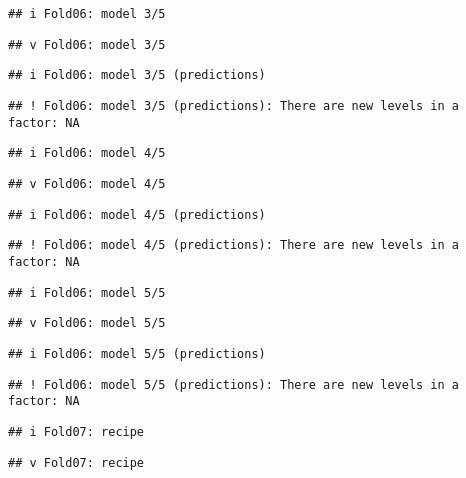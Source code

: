 \documentclass[
]{article}
\begin{document}
\begin{verbatim}
## i Fold06: model 3/5
\end{verbatim}

\begin{verbatim}
## v Fold06: model 3/5
\end{verbatim}

\begin{verbatim}
## i Fold06: model 3/5 (predictions)
\end{verbatim}

\begin{verbatim}
## ! Fold06: model 3/5 (predictions): There are new levels in a factor: NA
\end{verbatim}

\begin{verbatim}
## i Fold06: model 4/5
\end{verbatim}

\begin{verbatim}
## v Fold06: model 4/5
\end{verbatim}

\begin{verbatim}
## i Fold06: model 4/5 (predictions)
\end{verbatim}

\begin{verbatim}
## ! Fold06: model 4/5 (predictions): There are new levels in a factor: NA
\end{verbatim}

\begin{verbatim}
## i Fold06: model 5/5
\end{verbatim}

\begin{verbatim}
## v Fold06: model 5/5
\end{verbatim}

\begin{verbatim}
## i Fold06: model 5/5 (predictions)
\end{verbatim}

\begin{verbatim}
## ! Fold06: model 5/5 (predictions): There are new levels in a factor: NA
\end{verbatim}

\begin{verbatim}
## i Fold07: recipe
\end{verbatim}

\begin{verbatim}
## v Fold07: recipe
\end{verbatim}
\end{document}
